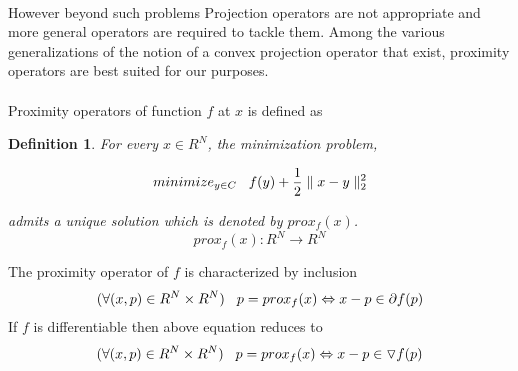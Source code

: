 \paragraph{}However beyond such problems Projection operators are not appropriate and more general operators 
are required to tackle them. Among the various generalizations of the notion of a convex projection 
operator that exist, proximity operators are best suited for our purposes.

\paragraph{}Proximity operators of function $f$ at $x$ is defined as
\newtheorem*{mydef}{Definition}
\begin{mydef}
For every $x \in R^N$, the minimization problem, 

\begin{equation}
 minimize_{y \in C} \hspace{3mm} f(y) + \frac{1}{2} \parallel x-y \parallel_2^2
\label{3.7}
\end{equation}

admits a unique solution which is denoted by $prox_f(x)$.
\begin{equation}
 prox_f(x) :R^N \rightarrow R^N
\label{3.8}
\end{equation}

\end{mydef}

The proximity operator of $f$ is characterized by inclusion 
\begin{equation}
 (\forall(x,p) \in R^N \times R^N) \hspace{3mm} p=prox_f(x) \Leftrightarrow x-p \in \partial f(p) 
\label{3.9}
\end{equation}
If $f$ is differentiable then above equation reduces to 
\begin{equation}
 (\forall(x,p) \in R^N \times R^N) \hspace{3mm} p=prox_f(x) \Leftrightarrow x-p \in \triangledown f(p)
  \label{3.10}
\end{equation}




